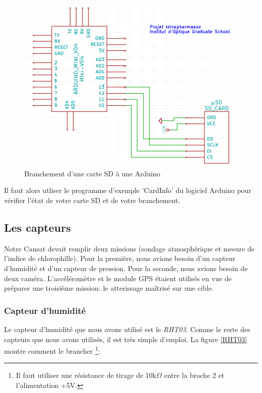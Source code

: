 \documentclass[twocolumn, 8pt]{article}
\begin{document}
\begin{figure}[!h]
	\centering
	\includegraphics[scale=.25]{SD.png}
	\caption{Branchement d'une carte SD à une Arduino}
	\label{SD}
\end{figure}

\par Il faut alors utliser le programme d'exemple \textsf{'CardInfo'} du logiciel Arduino pour vérifier l'état de votre carte SD et de votre branchement.


\subsection{Les capteurs}
\par Notre Cansat devait remplir deux missions (sondage atmosphérique et mesure de l'indice de chlorophille). Pour la première, nous avions besoin d'un capteur d'humidité et d'un capteur de pression. Pour la seconde, nous avions besoin de deux caméra. L'accéléromètre et le module GPS étaient utilisés en vue de préparer une troisième mission: le atterissage maîtrisé sur une cible.

\subsubsection{Capteur d'humidité}
\par Le capteur d'humidité que nous avons utilisé est le \emph{RHT03}. Comme le reste des capteurs que nous avons utilisés, il est très simple d'emploi. La figure \ref{RHT03} montre comment le brancher \footnote{Il faut utiliser une résistance de tirage de 10k$\Omega$ entre la broche \no{}2 et l'alimentation +5V.}:
\end{document}
